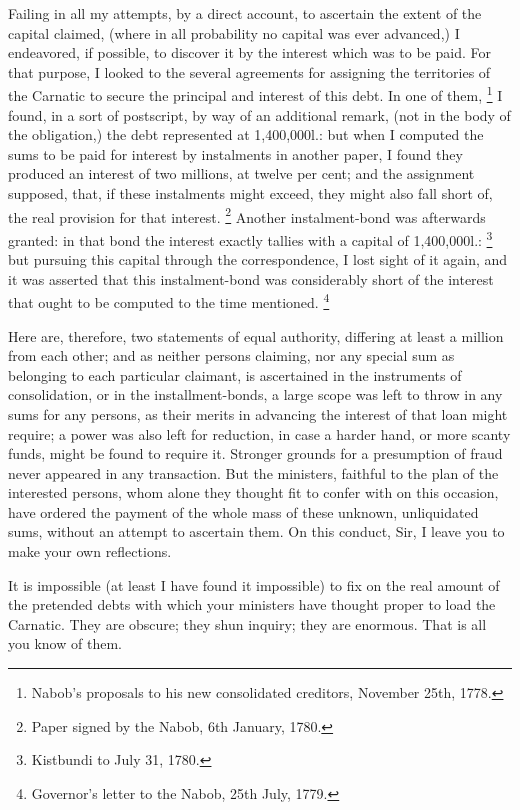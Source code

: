 Failing in all my attempts, by a direct account, to ascertain the extent of the capital claimed, (where in all probability no capital was ever advanced,) I endeavored, if possible, to discover it by the interest which was to be paid. For that purpose, I looked to the several agreements for assigning the territories of the Carnatic to secure the principal and interest of this debt. In one of them,
\footnote{ Nabob's proposals to his new consolidated creditors, November 25th, 1778.}
 I found, in a sort of postscript, by way of an additional remark, (not in the body of the obligation,) the debt represented at 1,400,000l.: but when I computed the sums to be paid for interest by instalments in another paper, I found they produced an interest of two millions, at twelve per cent; and the assignment supposed, that, if these instalments might exceed, they might also fall short of, the real provision for that interest.
\footnote{ Paper signed by the Nabob, 6th January, 1780.}
 Another instalment-bond was afterwards granted: in that bond the interest exactly tallies with a capital of 1,400,000l.:
\footnote{ Kistbundi to July 31, 1780.}
 but pursuing this capital through the correspondence, I lost sight of it again, and it was asserted that this instalment-bond was considerably short of the interest that ought to be computed to the time mentioned.
\footnote{ Governor's letter to the Nabob, 25th July, 1779.}


Here are, therefore, two statements of equal authority, differing at least a million from each other; and as neither persons claiming, nor any special sum as belonging to each particular claimant, is ascertained in the instruments of consolidation, or in the installment-bonds, a large scope was left to throw in any sums for any persons, as their merits in advancing the interest of that loan might require; a power was also left for reduction, in case a harder hand, or more scanty funds, might be found to require it. Stronger grounds for a presumption of fraud never appeared in any transaction. But the ministers, faithful to the plan of the interested persons, whom alone they thought fit to confer with on this occasion, have ordered the payment of the whole mass of these unknown, unliquidated sums, without an attempt to ascertain them. On this conduct, Sir, I leave you to make your own reflections.

It is impossible (at least I have found it impossible) to fix on the real amount of the pretended debts with which your ministers have thought proper to load the Carnatic. They are obscure; they shun inquiry; they are enormous. That is all you know of them.

